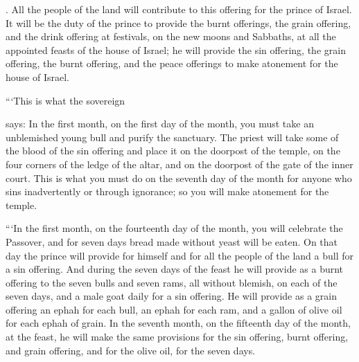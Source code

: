 {{}.
All
the people
of the land
will
contribute to this
offering
for the prince
of Israel.
It
will be
the duty of the prince
to provide the burnt offerings,
the grain offering,
and the drink offering
at festivals,
on the new moons
and Sabbaths,
at all
the appointed feasts
of the house
of Israel;
he
will provide
the
sin offering,
the
grain offering,
the
burnt offering,
and the
peace offerings
to make atonement
for the house
of Israel.
\par }{\PP {}“‘This is what
the sovereign

{}
says: In the first
month, on the first
day of the month,
you must take
an unblemished
young
bull
and purify
the sanctuary.
The priest
will take
some of the blood
of the sin offering
and place
it on the doorpost
of the temple,
on the four
corners
of the ledge
of the altar,
and on
the doorpost
of the gate
of the inner
court.
This
is what you must do
on the seventh
day of the month
for anyone
who sins inadvertently
or through ignorance;
so you will make atonement
for the temple.
\par }{\PP {}“‘In the first
month, on the fourteenth
day
of the month,
you will
celebrate
the Passover,
and for seven
days
bread made without yeast
will be eaten.
On that day
the prince
will provide
for himself
and for all
the people
of the land
a bull
for a sin offering.
And during
the seven
days
of the feast
he
will provide
as a burnt offering
to the
{}
seven
bulls
and seven
rams,
all without blemish,
on each
of the seven
days,
and a male
goat
daily
for a sin offering.
He will provide as a grain offering
an ephah
for each bull,
an ephah
for each ram,
and a gallon
of olive oil
for each ephah of grain.
In the seventh
month, on the fifteenth
day
of the month,
at the feast,
he will make
the same provisions
for the sin offering,
burnt offering,
and grain offering,
and for the olive oil,
for the seven
days.

\par }
